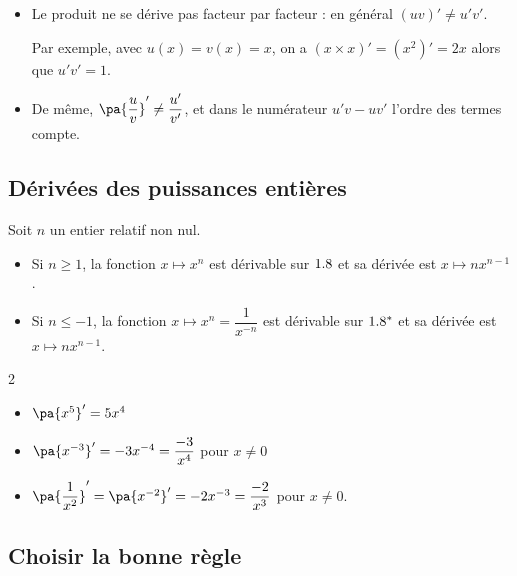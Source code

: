 \begin{erreur}
	\nline
	\begin{itemize}
		\item Le produit ne se dérive pas facteur par facteur : en général $(uv)' \neq u'v'$.

		      Par exemple, avec $u(x) = v(x) = x$, on a $(x \times x)' = (x^2)' = 2x$ alors que $u'v' = 1$.

		\item De même, $\pa{\dfrac{u}{v}}' \neq \dfrac{u'}{v'}$, et dans le numérateur $u'v - uv'$ l'ordre des termes compte.
	\end{itemize}
\end{erreur}

\subsection{Dérivées des puissances entières}

\begin{propriete}
	Soit $n$ un entier relatif non nul.
	\begin{itemize}
		\item Si $n \geq 1$, la fonction $x \longmapsto x^n$ est dérivable sur $1.8$ et sa dérivée est $x \longmapsto nx^{n-1}$.
		\item Si $n \leq -1$, la fonction $x \longmapsto x^n = \dfrac{1}{x^{-n}}$ est dérivable sur $1.8^*$ et sa dérivée est $x \longmapsto nx^{n-1}$.
	\end{itemize}
\end{propriete}

\begin{ex}
	\nline
	\begin{multicols}{2}
		\begin{itemize}
			\item $\pa{x^5}' = 5x^4$
			\item $\pa{x^{-3}}' = -3x^{-4} = \dfrac{-3}{x^4}$ pour $x \neq 0$
			\item $\pa{\dfrac{1}{x^2}}' = \pa{x^{-2}}' = -2x^{-3} = \dfrac{-2}{x^3}$ pour $x \neq 0$.
		\end{itemize}
	\end{multicols}
\end{ex}

\subsection{Choisir la bonne règle}

